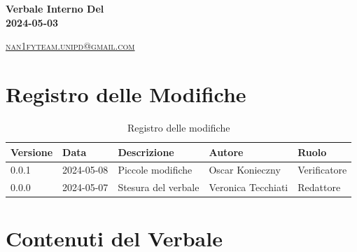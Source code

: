 \documentclass[8pt]{article}
\begin{document}
\begin{titlepage}
\begin{minipage}[t]{0.47\textwidth}
{		}
		\vspace{4mm}\vspace{4mm}
	\end{minipage}
	\vspace{4cm}
	\begin{center}
		\begin{flushright}
			{\fontsize{30pt}{52pt}\selectfont \textbf{Verbale Interno Del\\2024-05-03\\}} %
		\end{flushright}
		\vspace{3cm}
	\end{center}
	\vspace{8 cm}
	{\small \textsc{\href{mailto: nan1fyteam.unipd@gmail.com}{nan1fyteam.unipd@gmail.com}}}
\end{titlepage}
\pagestyle{mystyle}
\section*{Registro delle Modifiche}
\begin{table}[ht!]	
	\centering
	\begin{tabular}{p{1.2cm} p{2cm} p{6cm} p{3cm} p{2cm}}
		\toprule
		\textbf{Versione}& \textbf{Data} & \textbf{Descrizione} & \textbf{Autore} & \textbf{Ruolo} \\
		\midrule
		0.0.1 & 2024-05-08 & Piccole modifiche & Oscar Konieczny & Verificatore \\
		0.0.0 & 2024-05-07 & Stesura del verbale & Veronica Tecchiati & Redattore \\
		\bottomrule
	\end{tabular}
	\caption{Registro delle modifiche}
	\label{table:Registro delle modifiche}
\end{table}
\newpage
\tableofcontents
\clearpage
\newpage
\justifying
\section{Contenuti del Verbale}
\end{document}
